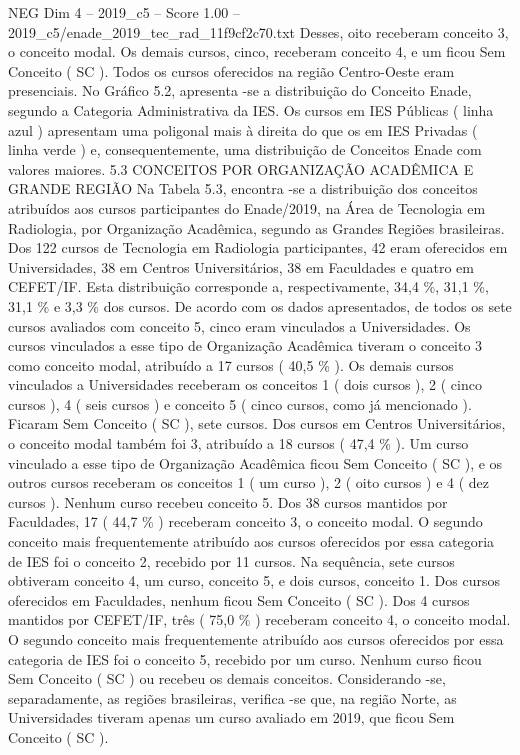 \begin{textsample}{NEG Dim 4 – 2019\_c5 – Score 1.00 – 2019\_c5/enade\_2019\_tec\_rad\_11f9cf2c70.txt}
Desses, oito receberam conceito 3, o conceito modal.
Os demais cursos, cinco, receberam conceito 4, e um ficou Sem Conceito ( SC ).
Todos os cursos oferecidos na região Centro-Oeste eram presenciais.
No Gráfico 5.2, apresenta -se a distribuição do Conceito Enade, segundo a Categoria Administrativa da IES.
Os cursos em IES Públicas ( linha azul ) apresentam uma poligonal mais à direita do que os em IES Privadas ( linha verde ) e, consequentemente, uma distribuição de Conceitos Enade com valores maiores. 5.3 CONCEITOS POR ORGANIZAÇÃO ACADÊMICA E GRANDE REGIÃO Na Tabela 5.3, encontra -se a distribuição dos conceitos atribuídos aos cursos participantes do Enade/2019, na Área de Tecnologia em Radiologia, por Organização Acadêmica, segundo as Grandes Regiões brasileiras.
Dos 122 cursos de Tecnologia em Radiologia participantes, 42 eram oferecidos em Universidades, 38 em Centros Universitários, 38 em Faculdades e quatro em CEFET/IF.
Esta distribuição corresponde a, respectivamente, 34,4 \%, 31,1 \%, 31,1 \% e 3,3 \% dos cursos.
De acordo com os dados apresentados, de todos os sete cursos avaliados com conceito 5, cinco eram vinculados a Universidades.
Os cursos vinculados a esse tipo de Organização Acadêmica tiveram o conceito 3 como conceito modal, atribuído a 17 cursos ( 40,5 \% ).
Os demais cursos vinculados a Universidades receberam os conceitos 1 ( dois cursos ), 2 ( cinco cursos ), 4 ( seis cursos ) e conceito 5 ( cinco cursos, como já mencionado ).
Ficaram Sem Conceito ( SC ), sete cursos.
Dos cursos em Centros Universitários, o conceito modal também foi 3, atribuído a 18 cursos ( 47,4 \% ).
Um curso vinculado a esse tipo de Organização Acadêmica ficou Sem Conceito ( SC ), e os outros cursos receberam os conceitos 1 ( um curso ), 2 ( oito cursos ) e 4 ( dez cursos ).
Nenhum curso recebeu conceito 5.
Dos 38 cursos mantidos por Faculdades, 17 ( 44,7 \% ) receberam conceito 3, o conceito modal.
O segundo conceito mais frequentemente atribuído aos cursos oferecidos por essa categoria de IES foi o conceito 2, recebido por 11 cursos.
Na sequência, sete cursos obtiveram conceito 4, um curso, conceito 5, e dois cursos, conceito 1.
Dos cursos oferecidos em Faculdades, nenhum ficou Sem Conceito ( SC ).
Dos 4 cursos mantidos por CEFET/IF, três ( 75,0 \% ) receberam conceito 4, o conceito modal.
O segundo conceito mais frequentemente atribuído aos cursos oferecidos por essa categoria de IES foi o conceito 5, recebido por um curso.
Nenhum curso ficou Sem Conceito ( SC ) ou recebeu os demais conceitos.
Considerando -se, separadamente, as regiões brasileiras, verifica -se que, na região Norte, as Universidades tiveram apenas um curso avaliado em 2019, que ficou Sem Conceito ( SC ).

\end{textsample}
